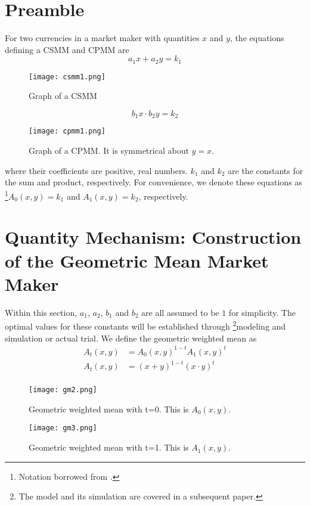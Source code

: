 \documentclass{article}
\author{Erissat Allan}
\date{}
\begin{document}


\section{Preamble}
For two currencies in a market maker with quantities ${x}$ and ${y}$, the equations defining a CSMM and CPMM are
$$ a_1x + a_2y = k_1 $$
\begin{figure}[htp]
    \centering
    \texttt{[image: csmm1.png]}
    \caption{Graph of a CSMM}
    \label{fig:CSMM1}
\end{figure}

$$ b_1x \cdot b_2y = k_2 $$
\begin{figure}[htp]
    \centering
    \texttt{[image: cpmm1.png]}
    \caption{Graph of a CPMM. It is symmetrical about $y=x$.}
    \label{fig:CPMM1}
\end{figure}

\noindent where their coefficients are positive, real numbers. ${k_1}$ and ${k_2}$ are the constants for the sum and product, respectively. For convenience, we denote these equations as \footnote{Notation borrowed from \cite{port2022mixing}.}${A_0(x,y)} = k_1$ and ${A_1(x,y)} = k_2$, respectively.

\section{Quantity Mechanism: Construction of the Geometric Mean Market Maker}
Within this section, $a_1$, $a_2$, $b_1$ and $b_2$ are all assumed to be $1$ for simplicity. The optimal values for these constants will be established through \footnote{The model and its simulation are covered in a subsequent paper.}modeling and simulation or actual trial.
\noindent We define the geometric weighted mean as
\begin{align*}
    A_t(x,y) &= A_0(x,y)^{1-t}A_1(x,y)^{t} \\
    A_t(x,y) &= (x + y)^{1-t}(x \cdot y)^{t} \\
\end{align*}

\begin{figure}[htp]
    \centering
    \texttt{[image: gm2.png]}
    \caption{Geometric weighted mean with t=0.  This is $A_0(x,y).$}
    \label{fig:GM2}
\end{figure}

\begin{figure}[htp]
    \centering
    \texttt{[image: gm3.png]}
    \caption{Geometric weighted mean with t=1. This is $A_1(x,y)$.}
    \label{fig:GM3}
\end{figure}
\end{document}
